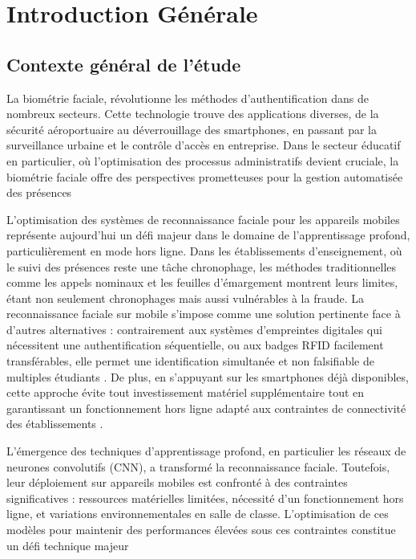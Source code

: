 \chapter{Introduction Générale}
\begin{onehalfspace}

\section{Contexte général de l'étude}

\hspace{0.65 cm} La biométrie faciale, révolutionne les méthodes d'authentification dans de nombreux secteurs. Cette technologie trouve des applications diverses, de la sécurité aéroportuaire au déverrouillage des smartphones, en passant par la surveillance urbaine et le contrôle d'accès en entreprise. Dans le secteur éducatif en particulier, où l'optimisation des processus administratifs devient cruciale, la biométrie faciale offre des perspectives prometteuses pour la gestion automatisée des présences \cite{2024Raj10522165}

\hspace{0.65 cm}L'optimisation des systèmes de reconnaissance faciale pour les appareils mobiles représente aujourd'hui un défi majeur dans le domaine de l'apprentissage profond, particulièrement en mode hors ligne. Dans les établissements d'enseignement, où le suivi des présences reste une tâche chronophage, les méthodes traditionnelles comme les appels nominaux et les feuilles d'émargement montrent leurs limites, étant non seulement chronophages mais aussi vulnérables à la fraude. La reconnaissance faciale sur mobile s'impose comme une solution pertinente face à d'autres alternatives : contrairement aux systèmes d'empreintes digitales qui nécessitent une authentification séquentielle, ou aux badges RFID facilement transférables, elle permet une identification simultanée et non falsifiable de multiples étudiants \cite{2021Brown9395836}. De plus, en s'appuyant sur les smartphones déjà disponibles, cette approche évite tout investissement matériel supplémentaire tout en garantissant un fonctionnement hors ligne adapté aux contraintes de connectivité des établissements \cite{2020Bhat9155755}.

\hspace{0.65 cm}L'émergence des techniques d'apprentissage profond, en particulier les réseaux de neurones convolutifs (CNN), a transformé la reconnaissance faciale. Toutefois, leur déploiement sur appareils mobiles est confronté à des contraintes significatives : ressources matérielles limitées, nécessité d'un fonctionnement hors ligne, et variations environnementales en salle de classe. L'optimisation de ces modèles pour maintenir des performances élevées sous ces contraintes constitue un défi technique majeur \cite{2024Fernando18302}





\end{onehalfspace}
